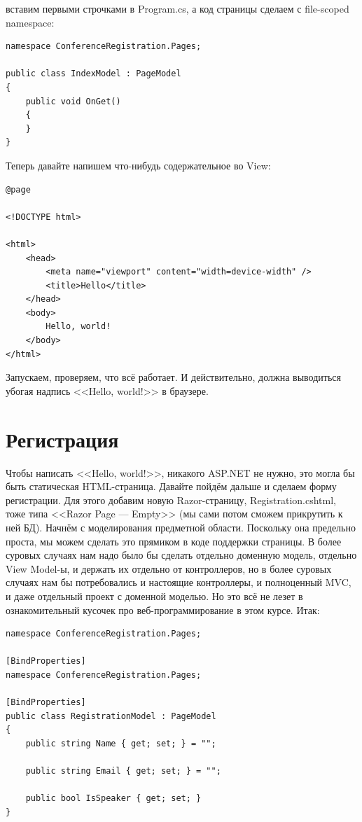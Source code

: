 \documentclass[a5paper]{article}
\begin{document}
вставим первыми строчками в Program.cs, а код страницы сделаем с file-scoped namespace:

\begin{verbatim}
namespace ConferenceRegistration.Pages;

public class IndexModel : PageModel
{
    public void OnGet()
    {
    }
}
\end{verbatim}

Теперь давайте напишем что-нибудь содержательное во View:

\begin{verbatim}
@page

<!DOCTYPE html>

<html>
    <head>
        <meta name="viewport" content="width=device-width" />
        <title>Hello</title>
    </head>
    <body>
        Hello, world!
    </body>
</html>
\end{verbatim}

Запускаем, проверяем, что всё работает. И действительно, должна выводиться убогая надпись <<Hello, world!>> в браузере.

\section{Регистрация}

Чтобы написать <<Hello, world!>>, никакого ASP.NET не нужно, это могла бы быть статическая HTML-страница. Давайте пойдём дальше и сделаем форму регистрации. Для этого добавим новую Razor-страницу, Registration.cshtml, тоже типа <<Razor Page --- Empty>> (мы сами потом сможем прикрутить к ней БД). Начнём с моделирования предметной области. Поскольку она предельно проста, мы можем сделать это прямиком в коде поддержки страницы. В более суровых случаях нам надо было бы сделать отдельно доменную модель, отдельно View Model-ы, и держать их отдельно от контроллеров, но в более суровых случаях нам бы потребовались и настоящие контроллеры, и полноценный MVC, и даже отдельный проект с доменной моделью. Но это всё не лезет в ознакомительный кусочек про веб-программирование в этом курсе. Итак:

\begin{verbatim}
namespace ConferenceRegistration.Pages;

[BindProperties]
namespace ConferenceRegistration.Pages;

[BindProperties]
public class RegistrationModel : PageModel
{
    public string Name { get; set; } = "";

    public string Email { get; set; } = "";

    public bool IsSpeaker { get; set; }
}
\end{verbatim}
\end{document}
